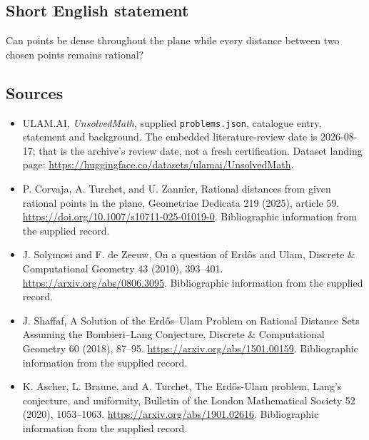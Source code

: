\documentclass[11pt,a4paper]{article}
\begin{document}
\subsection{Short English statement}

Can points be dense throughout the plane while every distance between two chosen points remains rational?

\subsection{Sources}

{\small

\begin{itemize}

\item[\hypertarget{source:statement:1}{S1}] ULAM.AI, \emph{UnsolvedMath}, supplied \texttt{problems.json}, catalogue entry, statement and background. The embedded literature-review date is 2026-08-17; that is the archive’s review date, not a fresh certification. Dataset landing page: \url{https://huggingface.co/datasets/ulamai/UnsolvedMath}.

\item[\hypertarget{source:statement:2}{S2}] P. Corvaja, A. Turchet, and U. Zannier, Rational distances from given rational points in the plane, Geometriae Dedicata 219 (2025), article 59. \url{https://doi.org/10.1007/s10711-025-01019-0}. Bibliographic information from the supplied record.

\item[\hypertarget{source:statement:3}{S3}] J. Solymosi and F. de Zeeuw, On a question of Erdős and Ulam, Discrete \& Computational Geometry 43 (2010), 393–401. \url{https://arxiv.org/abs/0806.3095}. Bibliographic information from the supplied record.

\item[\hypertarget{source:statement:4}{S4}] J. Shaffaf, A Solution of the Erdős–Ulam Problem on Rational Distance Sets Assuming the Bombieri–Lang Conjecture, Discrete \& Computational Geometry 60 (2018), 87–95. \url{https://arxiv.org/abs/1501.00159}. Bibliographic information from the supplied record.

\item[\hypertarget{source:statement:5}{S5}] K. Ascher, L. Braune, and A. Turchet, The Erdős-Ulam problem, Lang's conjecture, and uniformity, Bulletin of the London Mathematical Society 52 (2020), 1053–1063. \url{https://arxiv.org/abs/1901.02616}. Bibliographic information from the supplied record.

\end{itemize}

}

\label{end:statement}
\end{document}
